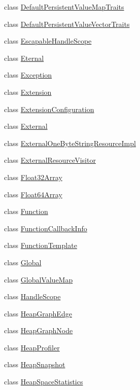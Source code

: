 \begin{DoxyCompactItemize}
\item 
class \hyperlink{classv8_1_1_default_persistent_value_map_traits}{Default\+Persistent\+Value\+Map\+Traits}
\item 
class \hyperlink{classv8_1_1_default_persistent_value_vector_traits}{Default\+Persistent\+Value\+Vector\+Traits}
\item 
class \hyperlink{classv8_1_1_escapable_handle_scope}{Escapable\+Handle\+Scope}
\item 
class \hyperlink{classv8_1_1_eternal}{Eternal}
\item 
class \hyperlink{classv8_1_1_exception}{Exception}
\item 
class \hyperlink{classv8_1_1_extension}{Extension}
\item 
class \hyperlink{classv8_1_1_extension_configuration}{Extension\+Configuration}
\item 
class \hyperlink{classv8_1_1_external}{External}
\item 
class \hyperlink{classv8_1_1_external_one_byte_string_resource_impl}{External\+One\+Byte\+String\+Resource\+Impl}
\item 
class \hyperlink{classv8_1_1_external_resource_visitor}{External\+Resource\+Visitor}
\item 
class \hyperlink{classv8_1_1_float32_array}{Float32\+Array}
\item 
class \hyperlink{classv8_1_1_float64_array}{Float64\+Array}
\item 
class \hyperlink{classv8_1_1_function}{Function}
\item 
class \hyperlink{classv8_1_1_function_callback_info}{Function\+Callback\+Info}
\item 
class \hyperlink{classv8_1_1_function_template}{Function\+Template}
\item 
class \hyperlink{classv8_1_1_global}{Global}
\item 
class \hyperlink{classv8_1_1_global_value_map}{Global\+Value\+Map}
\item 
class \hyperlink{classv8_1_1_handle_scope}{Handle\+Scope}
\item 
class \hyperlink{classv8_1_1_heap_graph_edge}{Heap\+Graph\+Edge}
\item 
class \hyperlink{classv8_1_1_heap_graph_node}{Heap\+Graph\+Node}
\item 
class \hyperlink{classv8_1_1_heap_profiler}{Heap\+Profiler}
\item 
class \hyperlink{classv8_1_1_heap_snapshot}{Heap\+Snapshot}
\item 
class \hyperlink{classv8_1_1_heap_space_statistics}{Heap\+Space\+Statistics}

\end{DoxyCompactItemize}
